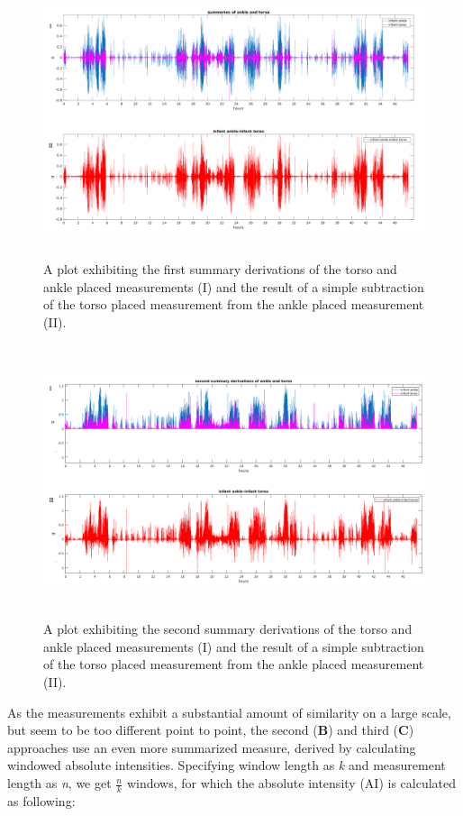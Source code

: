 \documentclass{article}
\begin{document}
{\newpage
\begin{figure}[h!]
\includegraphics[width=15cm, height=8cm]{SimpleSubtracting.png}
\caption{A plot exhibiting the first summary derivations of the torso and ankle placed measurements (I) and the result of a simple subtraction of the torso placed measurement from the ankle placed measurement (II).}
\end{figure}
\begin{figure}[h!]
\includegraphics[width=15cm, height=8cm]{bandpassJustSummary_and_A.png}
\caption{A plot exhibiting the second summary derivations of the torso and ankle placed measurements (I) and the result of a simple subtraction of the torso placed measurement from the ankle placed measurement (II).}
\end{figure}
\newpage
As the measurements exhibit a substantial amount of similarity on a large scale, but seem to be too different point to point, the second (\textbf{B}) and third (\textbf{C}) approaches use an even more summarized measure, derived by calculating windowed absolute intensities. Specifying window length as \textit{k} and measurement length as \textit{n}, we get  \( \frac{n}{k} \)  windows, for which the absolute intensity (AI) is calculated as following:
}
\end{document}
